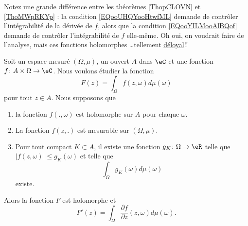 \begin{normaltext}
	Notez une grande différence entre les théorèmes \ref{ThopCLOVN} et \ref{ThoMWpRKYp} : la condition \eqref{EQooUHQYooHtwfML} demande de contrôler l'intégrabilité de la dérivée de \( f\), alors que la condition \eqref{EQooYILMooAlBQof} demande de contrôler l'intégrabilité de \( f\) elle-même. Oh oui, on voudrait faire de l'analyse, mais ces fonctions holomorphes \ldots tellement  \href{https://www.dragonball-multiverse.com/fr/page-1835.html}{déloyal}!!
\end{normaltext}

\begin{theorem} \label{ThopCLOVN}
	Soit un espace mesuré \( (\Omega,\mu)\), un ouvert \( A\) dans \( \eC\) et une fonction \( f\colon A\times \Omega\to \eC\). Nous voulons étudier la fonction
	\begin{equation}
		F(z)=\int_{\Omega}f(z,\omega)d\mu(\omega)
	\end{equation}
	pour tout \( z\in A\). Nous supposons que
	\begin{enumerate}
		\item
		      la fonction \( f(.,\omega)\) est holomorphe sur \( A\) pour chaque \( \omega\).
		\item
		      La fonction \( f(z,.)\) est mesurable sur \( (\Omega,\mu)\).
		\item
		      Pour tout compact \( K\subset A\), il existe une fonction \( g_K\colon \Omega\to \eR\) telle que \( | f(z,\omega) |\leq g_K(\omega)\) et telle que
		      \begin{equation}        \label{EQooYILMooAlBQof}
			      \int_{\Omega}g_K(\omega)d\mu(\omega)
		      \end{equation}
		      existe.
	\end{enumerate}
	Alors la fonction \( F\) est holomorphe et
	\begin{equation}
		F'(z)=\int_{\Omega}\frac{ \partial f }{ \partial z }(z,\omega)d\mu(\omega).
	\end{equation}
\end{theorem}

